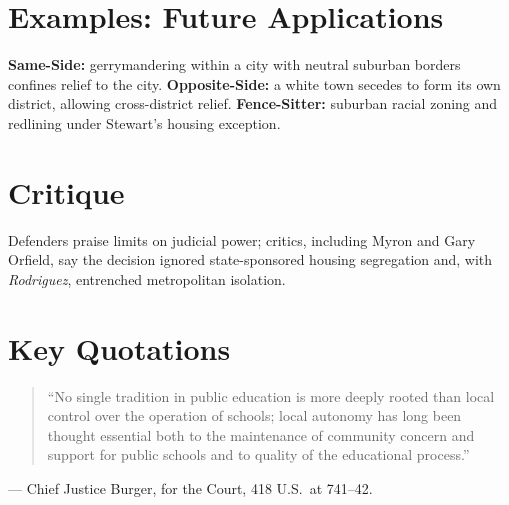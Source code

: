 \documentclass[12pt]{article}
\begin{document}
\section{Examples: Future Applications}
\textbf{Same-Side:} gerrymandering within a city with neutral suburban borders confines relief to the city. \textbf{Opposite-Side:} a white town secedes to form its own district, allowing cross-district relief. \textbf{Fence-Sitter:} suburban racial zoning and redlining under Stewart's housing exception.

\section{Critique}
Defenders praise limits on judicial power; critics, including Myron and Gary Orfield, say the decision ignored state-sponsored housing segregation and, with \textit{Rodriguez}, entrenched metropolitan isolation.

\section{Key Quotations}
\begin{quote}
``No single tradition in public education is more deeply rooted than local control over the operation of schools; local autonomy has long been thought essential both to the maintenance of community concern and support for public schools and to quality of the educational process.''
\end{quote}
\noindent --- Chief Justice Burger, for the Court, 418 U.S.\ at 741--42.
\end{document}

